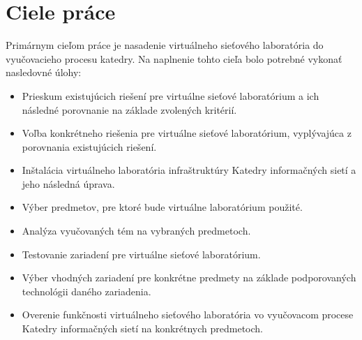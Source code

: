 \chapter{Ciele práce}

Primárnym cieľom práce je nasadenie virtuálneho sieťového laboratória do vyučovacieho procesu katedry. Na naplnenie tohto cieľa bolo potrebné vykonať nasledovné úlohy:

\begin{itemize}[noitemsep]
    \item Prieskum existujúcich riešení pre virtuálne sieťové laboratórium a ich následné porovnanie na základe zvolených kritérií.
    \item Voľba konkrétneho riešenia pre virtuálne sieťové laboratórium, vyplývajúca z porovnania existujúcich riešení.
    \item Inštalácia virtuálneho laboratória infraštruktúry Katedry informačných sietí a jeho následná úprava.
    \item Výber predmetov, pre ktoré bude virtuálne laboratórium použité.
    \item Analýza vyučovaných tém na vybraných predmetoch.
    \item Testovanie zariadení pre virtuálne sieťové laboratórium.
    \item Výber vhodných zariadení pre konkrétne predmety na základe podporovaných technológii daného zariadenia.
    \item Overenie funkčnosti virtuálneho sieťového laboratória vo vyučovacom procese Katedry informačných sietí na konkrétnych predmetoch.
\end{itemize}
